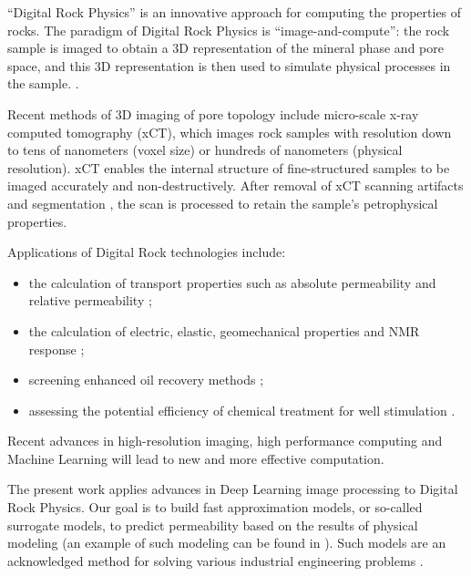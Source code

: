 \documentclass[review]{elsarticle}
\begin{document}
“Digital Rock Physics” is an innovative approach for computing the properties of rocks. The paradigm of Digital Rock Physics is “image-and-compute”: the rock sample is imaged to obtain a 3D representation of the mineral phase and pore space, and this 3D representation is then used to simulate physical processes in the sample. \cite{chauhan2016processing, koroteev2017method, andra2013digital_1,blunt2013pore}. 

Recent methods of 3D imaging of pore topology include micro-scale x-ray computed tomography (\textmu xCT), which images rock samples with resolution down to tens of nanometers (voxel size) or hundreds of nanometers (physical resolution). \textmu xCT enables the internal structure of fine-structured samples to be imaged accurately and non-destructively. After removal of \textmu xCT scanning artifacts and segmentation \cite{chauhan2016processing, koroteev2017method}, the scan is processed to retain the sample’s petrophysical properties.

Applications of Digital Rock technologies include:

\begin{itemize}

\item the calculation of transport properties such as absolute permeability and relative permeability \cite{andra2013digital_2, koroteev2014direct, berg2017industrial, blunt2013pore};

\item the calculation of electric, elastic, geomechanical properties and NMR response \cite{andra2013digital_2, blunt2013pore, evseev2015coupling};

\item screening enhanced oil recovery methods \cite{koroteev2013application};

\item assessing the potential efficiency of chemical treatment for well stimulation \cite{klemin2015digital}.

\end{itemize}

Recent advances in high-resolution imaging, high performance computing and Machine Learning will lead to new and more effective computation.

The present work applies advances in Deep Learning image processing to Digital Rock Physics. Our goal is to build fast approximation models, or so-called surrogate models, to predict permeability based on the results of physical modeling (an example of such modeling can be found in \cite{belyaev2016gtapprox}). Such models are an acknowledged method for solving various industrial engineering problems \cite{grihon2013surrogate}. 
\end{document}
